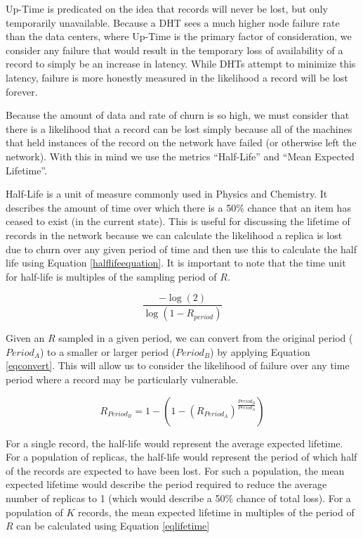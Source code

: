 	Up-Time is predicated on the idea that records will never be lost, but only temporarily unavailable.
	Because a DHT sees a much higher node failure rate than the data centers, where Up-Time is the primary factor of consideration, we consider any failure that would result in the temporary loss of availability of a record to simply be an increase in latency.
	While DHTs attempt to minimize this latency, failure is more honestly measured in the likelihood a record will be lost forever.
	
	Because the amount of data and rate of churn is so high, we must consider that there is a likelihood that a record can be lost simply because all of the machines that held instances of the record on the network have failed (or otherwise left the network).
	With this in mind we use the metrics ``Half-Life'' and ``Mean Expected Lifetime''.
	
	Half-Life is a unit of measure commonly used in Physics and Chemistry.
	It describes the amount of time over which there is a 50\% chance that an item has ceased to exist (in the current state).
	This is useful for discussing the lifetime of records in the network because we can calculate the likelihood a replica is lost due to churn over any given period of time and then use this to calculate the half life using Equation \ref{halflifeequation}.
	It is important to note that the time unit for half-life is multiples of the sampling period of $R$.
	
	\begin{equation}
		\frac{-\log(2)}{\log(1-R_{period})}
		\label{halflifeequation}
	\end{equation}
	
	Given an $R$ sampled in a given period, we can convert from the original period ($Period_{A}$) to a smaller or larger period ($Period_{B}$) by applying Equation \ref{eqconvert}.
	This will allow us to consider the likelihood of failure over any time period where a record may be particularly vulnerable.
	
	\begin{equation}
		R_{Period_{B}}=1-(1-(R_{Period_{A}})^{\frac{Period_{B}}{Period_{A}}})
		\label{eqconvert}
	\end{equation}
	
	For a single record, the half-life would represent the average expected lifetime.
	For a population of replicas, the half-life would represent the period of which half of the records are expected to have been lost.
	For such a population, the mean expected lifetime would describe the period required to reduce the average number of replicas to 1 (which would describe a 50\% chance of total loss).
	For a population of $K$ records, the mean expected lifetime in multiples of the period of $R$ can be calculated using Equation \ref{eqlifetime}
	

